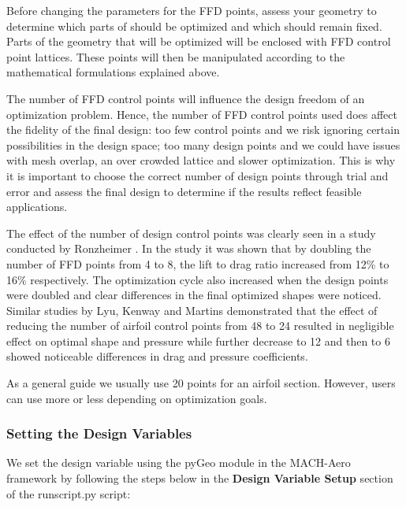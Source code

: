 \documentclass[12pt]{article}
\begin{document}
\noindent Before changing the parameters for the FFD points, assess your geometry to determine which parts of should be optimized and which should remain fixed. Parts of the geometry that will be optimized will be enclosed with FFD control point lattices. These points will then be manipulated according to the mathematical formulations explained above.\vspace{4mm}  

\noindent The number of FFD control points will influence the design freedom of an optimization problem. Hence, the number of FFD control points used does affect the fidelity of the final design: too few control points and we risk ignoring certain possibilities in the design space; too many design points and we could have issues with mesh overlap, an over crowded lattice and slower optimization. This is why it is important to choose the correct number of design points through trial and error and assess the final design to determine if the results reflect feasible applications.\vspace{4mm}  

\noindent The effect of the number of design control points was clearly seen in a study conducted by Ronzheimer \cite{Ronzheimer2006}. In the study it was shown that by doubling the number of FFD points from 4 to 8, the lift to drag ratio increased from 12\% to 16\% respectively. The optimization cycle also increased when the design points were doubled and clear differences in the final optimized shapes were noticed. Similar studies by Lyu, Kenway and Martins \cite{Lyu2014a} demonstrated that the effect of reducing the number of airfoil control points from 48 to 24 resulted in negligible effect on optimal shape and pressure while further decrease to 12 and then to 6 showed noticeable differences in drag and pressure coefficients.     \vspace{4mm} 

\noindent As a general guide we usually use 20 points for an airfoil section. However, users can use more or less depending on optimization goals. 

\subsubsection{Setting the Design Variables}

We set the design variable using the pyGeo module in the MACH-Aero framework by following the steps below in the \textbf{Design Variable Setup} section of the runscript.py script: 
\end{document}
